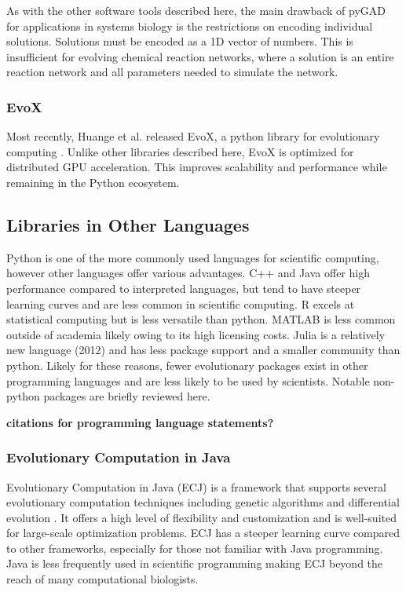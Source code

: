 \documentclass[12pt]{report}
\begin{document}
As with the other software tools described here, the main drawback of pyGAD for applications in systems biology is the restrictions on encoding individual solutions. Solutions must be encoded as a 1D vector of numbers. This is insufficient for evolving chemical reaction networks, where a solution is an entire reaction network and all parameters needed to simulate the network.

\subsubsection{EvoX}
Most recently, Huange et al. released EvoX, a python library for evolutionary computing \cite{Huang2024}. Unlike other libraries described here, EvoX is optimized for distributed GPU acceleration. This improves scalability and performance while remaining in the Python ecosystem.

\subsection{Libraries in Other Languages}
Python is one of the more commonly used languages for scientific computing, however other languages offer various advantages. C++ and Java offer high performance compared to interpreted languages, but tend to have steeper learning curves and are less common in scientific computing. R excels at statistical computing but is less versatile than python. MATLAB is less common outside of academia likely owing to its high licensing costs. Julia is a relatively new language (2012) and has less package support and a smaller community than python. Likely for these reasons, fewer evolutionary packages exist in other programming languages and are less likely to be used by scientists. Notable non-python packages are briefly reviewed here.

\textbf{citations for programming language statements?}

\subsubsection{Evolutionary Computation in Java}
Evolutionary Computation in Java (ECJ) is a framework that supports several evolutionary computation techniques including genetic algorithms and differential evolution \cite{Luke1998ECJSoftware}. It offers a high level of flexibility and customization and is well-suited for large-scale optimization problems. 
ECJ has a steeper learning curve compared to other frameworks, especially for those not familiar with Java programming. Java is less frequently used in scientific programming making ECJ beyond the reach of many computational biologists. 
\end{document}
